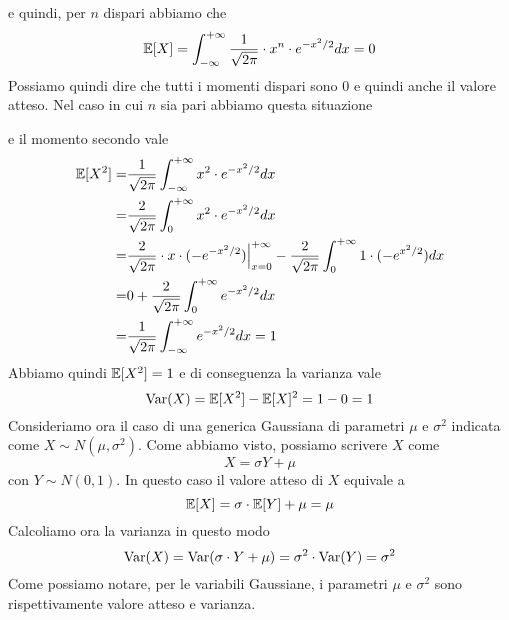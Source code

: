 e quindi, per $n$ dispari abbiamo che
\[ \mathbb{E}[X] = \int_{-\infty}^{+\infty} \frac{1}{\sqrt{2 \pi}} \cdot x^n \cdot e^{-x^2/2} dx = 0 \]
Possiamo quindi dire che tutti i momenti dispari sono 0 e quindi anche il valore atteso. Nel caso
in cui $n$ sia pari abbiamo questa situazione
\begin{center}
\end{center}
e il momento secondo vale
\begin{align*}
	\mathbb{E}[X^2] = & \frac{1}{\sqrt{2 \pi}} \int_{-\infty}^{+\infty} x^2 \cdot e^{-x^2/2} dx    \\
	=         & \frac{2}{\sqrt{2 \pi}} \int_{0}^{+\infty} x^2 \cdot e^{-x^2/2} dx          \\
	=         & \frac{2}{\sqrt{2 \pi}} \cdot x \cdot (-e^{-x^2/2}) \Big|_{x=0}^{+\infty} -
	\frac{2}{\sqrt{2 \pi}} \int_{0}^{+\infty} 1 \cdot (-e^{x^2/2}) dx                      \\
	=         & 0 + \frac{2}{\sqrt{2 \pi}} \int_{0}^{+\infty} e^{-x^2/2} dx                \\
	=         & \frac{1}{\sqrt{2 \pi}} \int_{-\infty}^{+\infty} e^{-x^2/2} dx = 1
\end{align*}
Abbiamo quindi $\mathbb{E}[X^2] = 1$ e di conseguenza la varianza vale
\[ \operatorname{Var}(X) = \mathbb{E}[X^2] - \mathbb{E}[X]^2 = 1 - 0 = 1 \]
Consideriamo ora il caso di una generica Gaussiana di parametri $\mu$ e $\sigma^2$ indicata come
$X \sim N(\mu, \sigma^2)$. Come abbiamo visto, possiamo scrivere $X$ come
\[ X = \sigma Y + \mu \]
con $Y \sim N(0,1)$. In questo caso il valore atteso di $X$ equivale a
\[ \mathbb{E}[X] = \sigma \cdot \mathbb{E}[Y] + \mu = \mu \]
Calcoliamo ora la varianza in questo modo
\[ \operatorname{Var}(X) = \operatorname{Var}(\sigma \cdot Y + \mu) = \sigma^2 \cdot \operatorname{Var}(Y) = \sigma^2 \]
Come possiamo notare, per le variabili Gaussiane, i parametri $\mu$ e $\sigma^2$ sono
rispettivamente valore atteso e varianza.